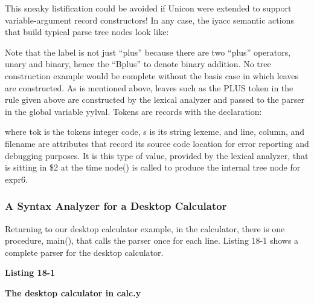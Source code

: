 
This sneaky listification could be avoided if Unicon were extended to
support variable-argument record constructors! In any case, the iyacc
semantic actions that build typical parse tree nodes look like:


Note that the label is not just
{\textquotedblleft}plus{\textquotedblright} because there are two
{\textquotedblleft}plus{\textquotedblright} operators, unary and
binary, hence the {\textquotedblleft}Bplus{\textquotedblright} to
denote binary addition. No tree construction example would be complete
without the basis case in which leaves are constructed. As is mentioned
above, leaves such as the \textsf{PLUS} token in the rule given above
are constructed by the lexical analyzer and passed to the parser in the
global variable \textsf{yylval}. Tokens are records with the
declaration:


\noindent
where \textsf{tok} is the token{\textquotesingle}s integer code,
\textsf{s} is its string lexeme, and \textsf{line}, \textsf{column},
and \textsf{filename} are attributes that record its source code
location for error reporting and debugging purposes. It is this type of
value, provided by the lexical analyzer, that is sitting in
\textsf{\$2} at the time \textsf{node()} is called to produce the
internal tree node for \textsf{expr6}.

\subsubsection{A Syntax Analyzer for a Desktop Calculator}
Returning to our desktop calculator example, in the calculator, there is
one procedure, \textsf{main()}, that calls the parser once for each
line. Listing 18-1 shows a complete parser for the desktop calculator.

\bigskip

{\sffamily\bfseries
Listing 18-1}

{\sffamily\bfseries
The desktop calculator in calc.y}

